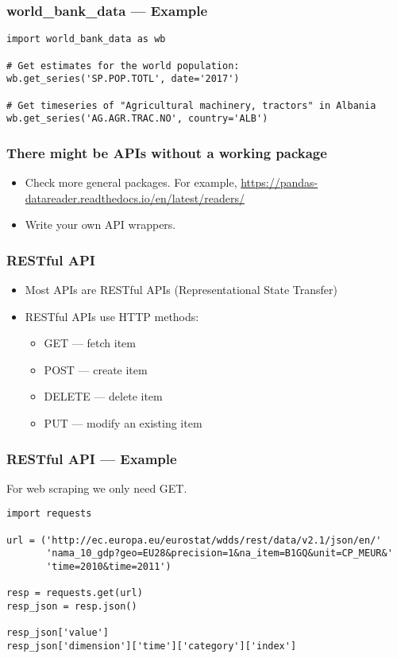 \begin{frame}[fragile]
    \frametitle{world\_bank\_data --- Example}
\begin{verbatim}
import world_bank_data as wb

# Get estimates for the world population:
wb.get_series('SP.POP.TOTL', date='2017')

# Get timeseries of "Agricultural machinery, tractors" in Albania
wb.get_series('AG.AGR.TRAC.NO', country='ALB')
\end{verbatim}
\end{frame}

\begin{frame}
    \frametitle{There might be APIs without a working package}
    \begin{itemize}
        \item Check more general packages. For example, \href{https://pandas-datareader.readthedocs.io/en/latest/readers/}{https://pandas-datareader.readthedocs.io/en/latest/readers/}
        \item Write your own API wrappers.
    \end{itemize}
\end{frame}

\begin{frame}
    \frametitle{RESTful API}
    \begin{itemize}
        \item Most APIs are RESTful APIs (Representational State Transfer)
        \item RESTful APIs use HTTP methods:
        \begin{itemize}
            \item GET --- fetch item
            \item POST --- create item
            \item DELETE --- delete item
            \item PUT --- modify an existing item
        \end{itemize}
    \end{itemize}
\end{frame}

\begin{frame}[fragile]
    \frametitle{RESTful API --- Example}

    For web scraping we only need GET.

\begin{verbatim}
import requests

url = ('http://ec.europa.eu/eurostat/wdds/rest/data/v2.1/json/en/'
       'nama_10_gdp?geo=EU28&precision=1&na_item=B1GQ&unit=CP_MEUR&'
       'time=2010&time=2011')

resp = requests.get(url)
resp_json = resp.json()

resp_json['value']
resp_json['dimension']['time']['category']['index']
\end{verbatim}
\end{frame}
